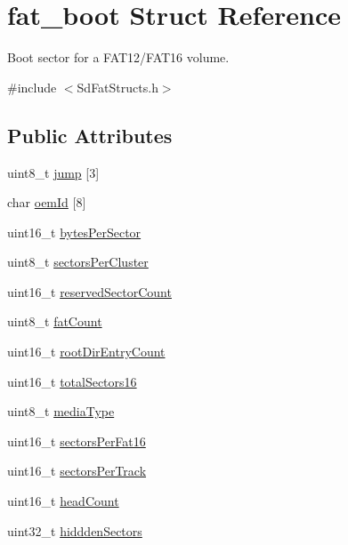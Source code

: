 \hypertarget{structfat__boot}{}\section{fat\+\_\+boot Struct Reference}
\label{structfat__boot}


Boot sector for a F\+A\+T12/\+F\+A\+T16 volume.  




{\ttfamily \#include $<$Sd\+Fat\+Structs.\+h$>$}

\subsection*{Public Attributes}
\begin{DoxyCompactItemize}
\item 
uint8\+\_\+t \hyperlink{structfat__boot_a83f9f2d1d0130f25f34c90dfc82e3751}{jump} \mbox{[}3\mbox{]}
\item 
char \hyperlink{structfat__boot_adc034212201e879fea1eb44db43e55a5}{oem\+Id} \mbox{[}8\mbox{]}
\item 
uint16\+\_\+t \hyperlink{structfat__boot_a60b2461f8ebf0ad295a95094e1bd7d65}{bytes\+Per\+Sector}
\item 
uint8\+\_\+t \hyperlink{structfat__boot_ab3063726125b16a2ccad719548d79abd}{sectors\+Per\+Cluster}
\item 
uint16\+\_\+t \hyperlink{structfat__boot_a13f272a8f780fb43a400f873a3fd7b73}{reserved\+Sector\+Count}
\item 
uint8\+\_\+t \hyperlink{structfat__boot_a04d3b6a45acf28a80ff909dc1b33da2f}{fat\+Count}
\item 
uint16\+\_\+t \hyperlink{structfat__boot_a2124f89e12307df944f08e6657dbf4af}{root\+Dir\+Entry\+Count}
\item 
uint16\+\_\+t \hyperlink{structfat__boot_ac8bd40dd9186882e423e10b0c83e89b7}{total\+Sectors16}
\item 
uint8\+\_\+t \hyperlink{structfat__boot_a63eaf7185663369af2527309634d3c90}{media\+Type}
\item 
uint16\+\_\+t \hyperlink{structfat__boot_a0d5ab13399759acfa571e49b85600db1}{sectors\+Per\+Fat16}
\item 
uint16\+\_\+t \hyperlink{structfat__boot_a6d5ceaf374e0607be8b8162bf657f282}{sectors\+Per\+Track}
\item 
uint16\+\_\+t \hyperlink{structfat__boot_ae31da876cd9f48de5268a129218df2c2}{head\+Count}
\item 
uint32\+\_\+t \hyperlink{structfat__boot_a18f1b4c245fe7bd09f5a9430c005e23a}{hiddden\+Sectors}

\end{DoxyCompactItemize}

